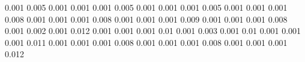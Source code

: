 0.001      0.005      %
0.001      0.001      %
0.001      0.005      %
0.001      0.001      %
0.001      0.005      %
0.001      0.001      %
0.001      0.008      %
0.001      0.001      %
0.001      0.008      %
0.001      0.001      %
0.001      0.009      %
0.001      0.001      %
0.001      0.008      %
0.001      0.002      %
0.001      0.012      %
0.001      0.001      %
0.001      0.01       %
0.001      0.003      %
0.001      0.01       %
0.001      0.001      %
0.001      0.011      %
0.001      0.001      %
0.001      0.008      %
0.001      0.001      %
0.001      0.008      %
0.001      0.001      %
0.001      0.012      %
